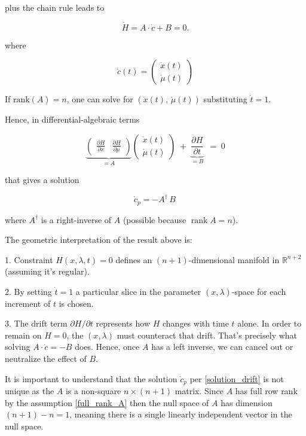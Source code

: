 \documentclass[11pt,american]{article}
\DeclareMathOperator{\rank}{\operatorname{rank}}
\begin{document}
plus the chain rule leads to

\[
\dot H = A \cdot \dot c + B = 0.
\]

where

\[
\dot c(t) = \begin{pmatrix} \dot{x}(t) \\ \dot{\mu}(t) \end{pmatrix}
\]
  
If $\mathrm{rank}(A)=n$, one can solve for $(\dot{x}(t),\,\dot{\mu}(t))$ substituting $\dot{t} = 1$.  

Hence, in differential-algebraic terms

\[
\underbrace{\begin{pmatrix}
\frac{\partial H}{\partial x} & \frac{\partial H}{\partial \mu}
\end{pmatrix}}_{=A}
\begin{pmatrix}
\dot{x}(t)\\[4pt]
\dot{\mu}(t)
\end{pmatrix}
\;+\;
\underbrace{\frac{\partial H}{\partial t}}_{=B}\
\;=\;
0
\]

that gives a solution

\begin{equation}\label{solution_drift}
\dot c_p = -A^\dagger\,B\,
\end{equation}

where $A^\dagger$ is a right-inverse of $A$ (possible because $\rank A=n$).

The geometric interpretation of the result above is:

1. Constraint $H(x,\lambda,t)=0$ defines an $(n+1)$-dimensional manifold in $\mathbb{R}^{n+2}$ (assuming it’s regular). 
 
2. By setting $\dot{t}=1$ a particular slice in the parameter $(x,\lambda)$-space for each increment of $t$ is chosen.  

3. The drift term $\partial H/\partial t$ represents how $H$ changes with time $t$ alone. In order to remain on $H=0$, the $(x,\lambda)$ must counteract that drift. That’s precisely what solving $A \cdot \dot c = -B$ does. Hence, once $A$ has a left inverse, we can cancel out or neutralize the effect of $B$.

It is important to understand that the solution $\dot c_p$ per \eqref{solution_drift} is not unique as the $A$ is a non-square $ n \times (n+1) $ matrix.
Since $ A $ has full row rank by the assumption \eqref{full_rank_A} then the null space of $ A $ has dimension $ (n+1) - n = 1 $, meaning there is a single linearly independent vector in the null space. 
\end{document}
